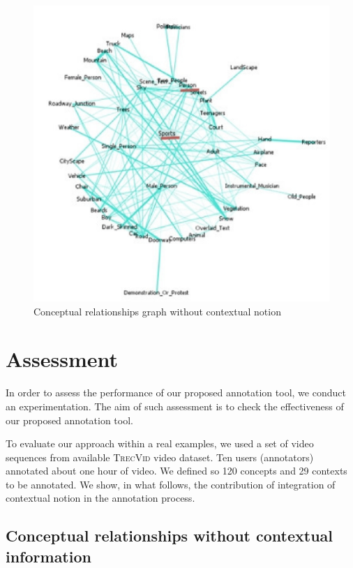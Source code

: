 \begin{figure}[ht!]	
			\centering
			\includegraphics[scale=0.3]{graphics/figa}
			\caption{Conceptual relationships graph without contextual notion}
			\label{figa}
		\end{figure}

\section{Assessment}

In order to assess the performance of our proposed annotation tool, we conduct an experimentation. The aim of such assessment is to check the effectiveness of our proposed annotation tool.

To evaluate our approach within a real examples, we used a set of video sequences from available \textsc{TrecVid} video dataset.  Ten users (annotators) annotated about one hour of video.
We defined so 120 concepts and 29 contexts to be annotated. We show, in what follows, the contribution of integration of contextual notion in the annotation process.

	\subsection{Conceptual relationships without contextual information}

